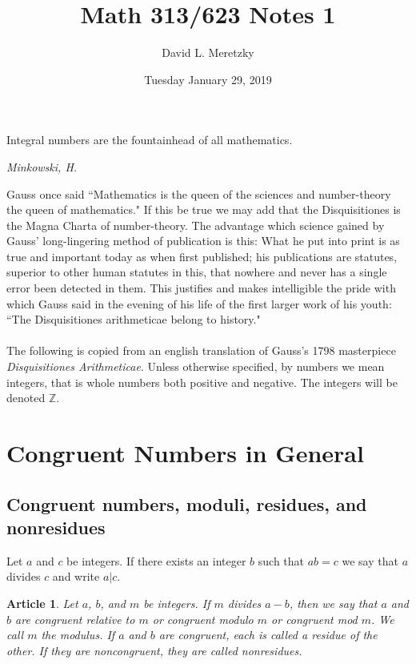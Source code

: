 \documentclass{article}
\title{ \vspace{-10ex} %
Math 313/623 Notes 1
}
\author{David L. Meretzky
}
\date{%
Tuesday January 29, 2019
}
\theoremstyle{problemstyle}
\newtheorem{article}{Article}
\begin{document}
\maketitle

\epigraph{Integral numbers are the fountainhead of all mathematics.}{\textit{Minkowski, H.}}

Gauss once said ``Mathematics is the queen of the sciences and number-theory the queen of mathematics." If this be true we may add that the Disquisitiones is the Magna Charta of number-theory. The advantage which science gained by Gauss' long-lingering method of publication is this: What he put into print is as true and important today as when first published; his publications are statutes, superior to other human statutes in this, that nowhere and never has a single error been detected in them. This justifies and makes intelligible the pride with which Gauss said in the evening of his life of the first larger work of his youth: ``The Disquisitiones arithmeticae belong to history."
\\[5pt]
\\

The following is copied from an english translation of Gauss's 1798 masterpiece \textit{Disquisitiones Arithmeticae}. Unless otherwise specified, by numbers we mean integers, that is whole numbers both positive and negative. The integers will be denoted $\mathbb{Z}$. 
\section{Congruent Numbers in General}

\subsection{Congruent numbers, moduli, residues, and nonresidues}

Let $a$ and $c$ be integers. If there exists an integer $b$ such that $ab = c$ we say that $a$ divides $c$ and write $a|c$.  

\begin{article}
Let $a$, $b$, and $m$ be integers. If $m$ divides $a-b$, then we say that $a$ and $b$ are \textit{congruent relative to $m$} or \textit{congruent modulo $m$} or \textit{congruent mod $m$}. We call $m$ the \textit{modulus}. If $a$ and $b$ are congruent, each is called a \textit{residue} of the other. If they are noncongruent, they are called nonresidues.     
\end{article}
\end{document}
